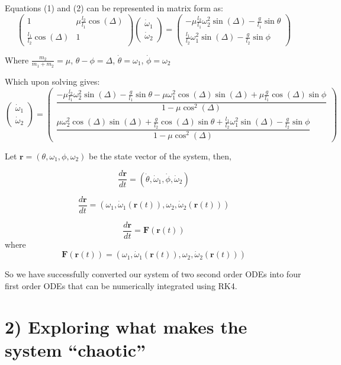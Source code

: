 \documentclass[12pt]{article}
\begin{document}
Equations (1) and (2) can be represented in matrix form as:
\[
\begin{pmatrix}
1 & \mu\frac{l_2}{l_1}\cos(\Delta)\\
\frac{l_1}{l_2}\cos(\Delta) & 1
\end{pmatrix}
\begin{pmatrix}
\dot{\omega}_1\\
\dot{\omega}_2
\end{pmatrix}
=
\begin{pmatrix}
-\mu\frac{l_2}{l_1}\omega_2^2\sin(\Delta)
-\frac{g}{l_1}\sin\theta\\
\frac{l_1}{l_2}\omega_1^2\sin(\Delta)
-\frac{g}{l_2}\sin\phi
\end{pmatrix}
\]

Where $\frac{m_2}{m_1+m_2}=\mu$, $\theta-\phi=\Delta$, $\dot{\theta}=\omega_1$, $\dot{\phi}=\omega_2$

Which upon solving gives:
\[
\begin{pmatrix}
\dot{\omega}_1\\
\dot{\omega}_2
\end{pmatrix}
=
\begin{pmatrix}
\dfrac{
-\mu\frac{l_2}{l_1}\omega_2^2\sin(\Delta)
-\frac{g}{l_1}\sin\theta
-\mu\omega_1^2\cos(\Delta)\sin(\Delta)
+\mu\frac{g}{l_1}\cos(\Delta)\sin\phi
}{
1-\mu\cos^2(\Delta)
}
\\[10pt]
\dfrac{
\mu\omega_2^2\cos(\Delta)\sin(\Delta)
+\frac{g}{l_2}\cos(\Delta)\sin\theta
+\frac{l_1}{l_2}\omega_1^2\sin(\Delta)
-\frac{g}{l_2}\sin\phi
}{
1-\mu\cos^2(\Delta)
}
\end{pmatrix}
\]

Let $\mathbf{r}=(\theta,\omega_1,\phi,\omega_2)$ be the state vector of the system, then,

\[
\frac{d\mathbf{r}}{dt}
=(\dot{\theta},\dot{\omega}_1,\dot{\phi},\dot{\omega}_2)
\]

\[
\frac{d\mathbf{r}}{dt}
=(\omega_1,\dot{\omega}_1(\mathbf{r}(t)),\omega_2,\dot{\omega}_2(\mathbf{r}(t)))
\]

\[
\frac{d\mathbf{r}}{dt}=\mathbf{F}(\mathbf{r}(t))
\]
where
\[
\mathbf{F}(\mathbf{r}(t))
=(\omega_1,\dot{\omega}_1(\mathbf{r}(t)),\omega_2,\dot{\omega}_2(\mathbf{r}(t)))
\]

So we have successfully converted our system of two second order ODEs into four first order ODEs that can be numerically integrated using RK4.

\section*{2) Exploring what makes the system ``chaotic''}
\end{document}
